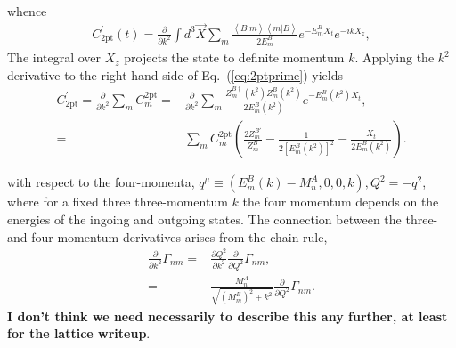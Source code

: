 \documentclass{PoS}
\newcommand{\dgr}[1]{\textcolor{David}{#1}}
\begin{document}
whence
\begin{align}
C^\prime_{\text{2pt}}(t)=\frac{\partial}{\partial k^2} \int d^3\vec{X} \sum_m \frac{\left<B | m\right>\left<m | B\right>}{2E_m^B} e^{-E_m^B X_t} e^{-ikX_z},\label{eq:2ptprime}
\end{align}
The integral over $X_z$ projects the state to
\dgr{definite momentum $k$}.
\dgr{Applying the $k^2$ derivative to the right-hand-side of
Eq.~(\ref{eq:2ptprime}) yields}
\begin{align}
C^\prime_{\text{2pt}} =\frac{\partial}{\partial k^2} \sum_m C_m^{\text{2pt}}= & \frac{\partial}{\partial k^2} \sum_m \frac{Z^{B\dagger}_m(k^2)Z^B_m(k^2)}{2E^B_m(k^2)}e^{-E_m^B(k^2)X_t},\\
= & \sum_m C^{\text{2pt}}_m \left(\frac{2Z_m^{B\prime}}{Z_m^B} - \frac{1}{2[E_m^B(k^2)]^2}-\frac{X_t}{2E_m^B(k^2)}\right).
\end{align}

with respect to the
four-momenta, $q^\mu \equiv (E_m^B(k) - M_n^A,0,0,k), Q^2 = - q^2$, where for a fixed
three three-momentum $k$ the four momentum depends on the energies of
the ingoing and outgoing states.
The connection between the three- and four-momentum derivatives arises
from the chain rule,
\begin{align}
\frac{\partial}{\partial k^2} \Gamma_{nm} = & \frac{\partial Q^2}{\partial k^2}\frac{\partial}{\partial Q^2}\Gamma_{nm},\\
= & \frac{M^A_n}{\sqrt{(M^B_m)^2+k^2}}\frac{\partial}{\partial Q^2} \Gamma_{nm}.
\end{align}
\dgr{\bfseries I don't think we need necessarily to describe this any
  further, at least for the lattice writeup}.
\end{document}
